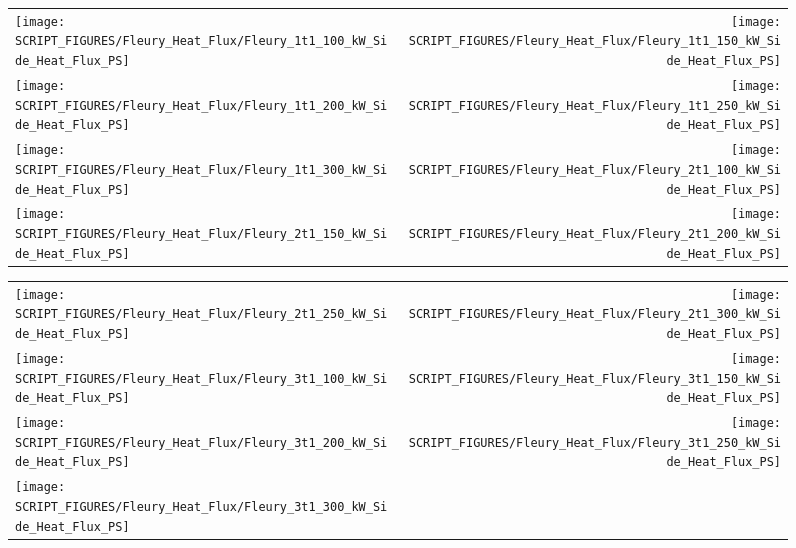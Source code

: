 \begin{figure}[p]
\begin{tabular*}{\textwidth}{l@{\extracolsep{\fill}}r}
\texttt{[image: SCRIPT\_FIGURES/Fleury\_Heat\_Flux/Fleury\_1t1\_100\_kW\_Side\_Heat\_Flux\_PS]} &
\texttt{[image: SCRIPT\_FIGURES/Fleury\_Heat\_Flux/Fleury\_1t1\_150\_kW\_Side\_Heat\_Flux\_PS]} \\
\texttt{[image: SCRIPT\_FIGURES/Fleury\_Heat\_Flux/Fleury\_1t1\_200\_kW\_Side\_Heat\_Flux\_PS]} &
\texttt{[image: SCRIPT\_FIGURES/Fleury\_Heat\_Flux/Fleury\_1t1\_250\_kW\_Side\_Heat\_Flux\_PS]} \\
\texttt{[image: SCRIPT\_FIGURES/Fleury\_Heat\_Flux/Fleury\_1t1\_300\_kW\_Side\_Heat\_Flux\_PS]} &
\texttt{[image: SCRIPT\_FIGURES/Fleury\_Heat\_Flux/Fleury\_2t1\_100\_kW\_Side\_Heat\_Flux\_PS]} \\
\texttt{[image: SCRIPT\_FIGURES/Fleury\_Heat\_Flux/Fleury\_2t1\_150\_kW\_Side\_Heat\_Flux\_PS]} &
\texttt{[image: SCRIPT\_FIGURES/Fleury\_Heat\_Flux/Fleury\_2t1\_200\_kW\_Side\_Heat\_Flux\_PS]}
\end{tabular*}
\end{figure}

\begin{figure}[p]
\begin{tabular*}{\textwidth}{l@{\extracolsep{\fill}}r}
\texttt{[image: SCRIPT\_FIGURES/Fleury\_Heat\_Flux/Fleury\_2t1\_250\_kW\_Side\_Heat\_Flux\_PS]} &
\texttt{[image: SCRIPT\_FIGURES/Fleury\_Heat\_Flux/Fleury\_2t1\_300\_kW\_Side\_Heat\_Flux\_PS]} \\
\texttt{[image: SCRIPT\_FIGURES/Fleury\_Heat\_Flux/Fleury\_3t1\_100\_kW\_Side\_Heat\_Flux\_PS]} &
\texttt{[image: SCRIPT\_FIGURES/Fleury\_Heat\_Flux/Fleury\_3t1\_150\_kW\_Side\_Heat\_Flux\_PS]} \\
\texttt{[image: SCRIPT\_FIGURES/Fleury\_Heat\_Flux/Fleury\_3t1\_200\_kW\_Side\_Heat\_Flux\_PS]} &
\texttt{[image: SCRIPT\_FIGURES/Fleury\_Heat\_Flux/Fleury\_3t1\_250\_kW\_Side\_Heat\_Flux\_PS]} \\
\texttt{[image: SCRIPT\_FIGURES/Fleury\_Heat\_Flux/Fleury\_3t1\_300\_kW\_Side\_Heat\_Flux\_PS]}
\end{tabular*}
\end{figure}


